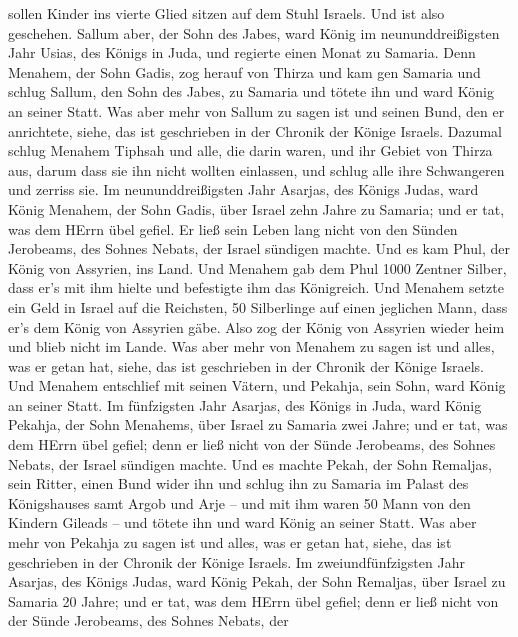 sollen Kinder ins vierte Glied sitzen auf dem Stuhl Israels. Und ist
also geschehen.  Sallum aber, der Sohn des Jabes, ward
König im neununddreißigsten Jahr Usias, des Königs in Juda, und regierte
einen Monat zu Samaria.  Denn Menahem, der Sohn Gadis, zog
herauf von Thirza und kam gen Samaria und schlug Sallum, den Sohn des
Jabes, zu Samaria und tötete ihn und ward König an seiner Statt.
 Was aber mehr von Sallum zu sagen ist und seinen Bund, den
er anrichtete, siehe, das ist geschrieben in der Chronik der Könige
Israels.  Dazumal schlug Menahem Tiphsah und alle, die
darin waren, und ihr Gebiet von Thirza aus, darum dass sie ihn nicht
wollten einlassen, und schlug alle ihre Schwangeren und zerriss sie.
 Im neununddreißigsten Jahr Asarjas, des Königs Judas, ward
König Menahem, der Sohn Gadis, über Israel zehn Jahre zu Samaria;
 und er tat, was dem HErrn übel gefiel. Er ließ sein Leben
lang nicht von den Sünden Jerobeams, des Sohnes Nebats, der Israel
sündigen machte.  Und es kam Phul, der König von Assyrien,
ins Land. Und Menahem gab dem Phul 1000 Zentner Silber, dass er's mit
ihm hielte und befestigte ihm das Königreich.  Und Menahem
setzte ein Geld in Israel auf die Reichsten, 50 Silberlinge auf einen
jeglichen Mann, dass er's dem König von Assyrien gäbe. Also zog der
König von Assyrien wieder heim und blieb nicht im Lande. 
Was aber mehr von Menahem zu sagen ist und alles, was er getan hat,
siehe, das ist geschrieben in der Chronik der Könige Israels.
 Und Menahem entschlief mit seinen Vätern, und Pekahja,
sein Sohn, ward König an seiner Statt.  Im fünfzigsten Jahr
Asarjas, des Königs in Juda, ward König Pekahja, der Sohn Menahems, über
Israel zu Samaria zwei Jahre;  und er tat, was dem HErrn
übel gefiel; denn er ließ nicht von der Sünde Jerobeams, des Sohnes
Nebats, der Israel sündigen machte.  Und es machte Pekah,
der Sohn Remaljas, sein Ritter, einen Bund wider ihn und schlug ihn zu
Samaria im Palast des Königshauses samt Argob und Arje -- und mit ihm
waren 50 Mann von den Kindern Gileads -- und tötete ihn und ward König
an seiner Statt.  Was aber mehr von Pekahja zu sagen ist
und alles, was er getan hat, siehe, das ist geschrieben in der Chronik
der Könige Israels.  Im zweiundfünfzigsten Jahr Asarjas,
des Königs Judas, ward König Pekah, der Sohn Remaljas, über Israel zu
Samaria 20 Jahre;  und er tat, was dem HErrn übel gefiel;
denn er ließ nicht von der Sünde Jerobeams, des Sohnes Nebats, der
